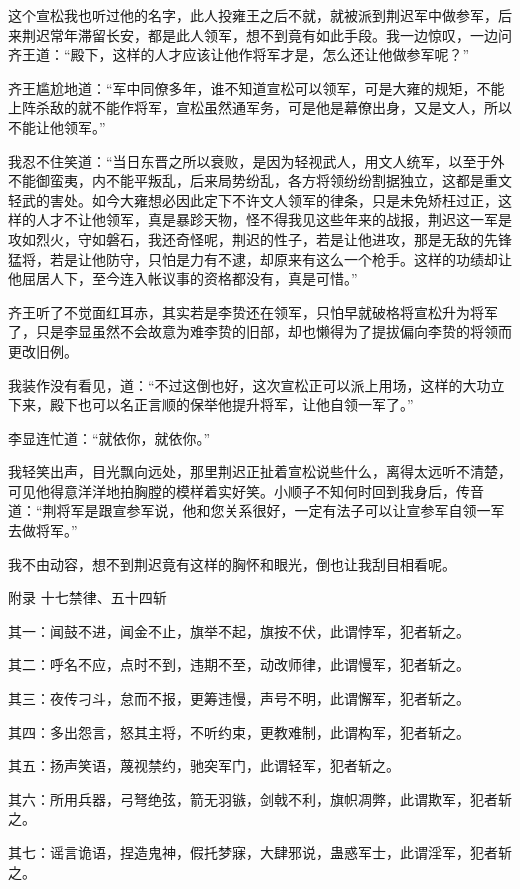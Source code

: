 这个宣松我也听过他的名字，此人投雍王之后不就，就被派到荆迟军中做参军，后来荆迟常年滞留长安，都是此人领军，想不到竟有如此手段。我一边惊叹，一边问齐王道：“殿下，这样的人才应该让他作将军才是，怎么还让他做参军呢？”

齐王尴尬地道：“军中同僚多年，谁不知道宣松可以领军，可是大雍的规矩，不能上阵杀敌的就不能作将军，宣松虽然通军务，可是他是幕僚出身，又是文人，所以不能让他领军。”

我忍不住笑道：“当日东晋之所以衰败，是因为轻视武人，用文人统军，以至于外不能御蛮夷，内不能平叛乱，后来局势纷乱，各方将领纷纷割据独立，这都是重文轻武的害处。如今大雍想必因此定下不许文人领军的律条，只是未免矫枉过正，这样的人才不让他领军，真是暴跈天物，怪不得我见这些年来的战报，荆迟这一军是攻如烈火，守如磐石，我还奇怪呢，荆迟的性子，若是让他进攻，那是无敌的先锋猛将，若是让他防守，只怕是力有不逮，却原来有这么一个枪手。这样的功绩却让他屈居人下，至今连入帐议事的资格都没有，真是可惜。”

齐王听了不觉面红耳赤，其实若是李贽还在领军，只怕早就破格将宣松升为将军了，只是李显虽然不会故意为难李贽的旧部，却也懒得为了提拔偏向李贽的将领而更改旧例。

我装作没有看见，道：“不过这倒也好，这次宣松正可以派上用场，这样的大功立下来，殿下也可以名正言顺的保举他提升将军，让他自领一军了。”

李显连忙道：“就依你，就依你。”

我轻笑出声，目光飘向远处，那里荆迟正扯着宣松说些什么，离得太远听不清楚，可见他得意洋洋地拍胸膛的模样着实好笑。小顺子不知何时回到我身后，传音道：“荆将军是跟宣参军说，他和您关系很好，一定有法子可以让宣参军自领一军去做将军。”

我不由动容，想不到荆迟竟有这样的胸怀和眼光，倒也让我刮目相看呢。

附录 十七禁律、五十四斩

其一：闻鼓不进，闻金不止，旗举不起，旗按不伏，此谓悖军，犯者斩之。

其二：呼名不应，点时不到，违期不至，动改师律，此谓慢军，犯者斩之。

其三：夜传刁斗，怠而不报，更筹违慢，声号不明，此谓懈军，犯者斩之。

其四：多出怨言，怒其主将，不听约束，更教难制，此谓构军，犯者斩之。

其五：扬声笑语，蔑视禁约，驰突军门，此谓轻军，犯者斩之。

其六：所用兵器，弓弩绝弦，箭无羽镞，剑戟不利，旗帜凋弊，此谓欺军，犯者斩之。

其七：谣言诡语，捏造鬼神，假托梦寐，大肆邪说，蛊惑军士，此谓淫军，犯者斩之。

